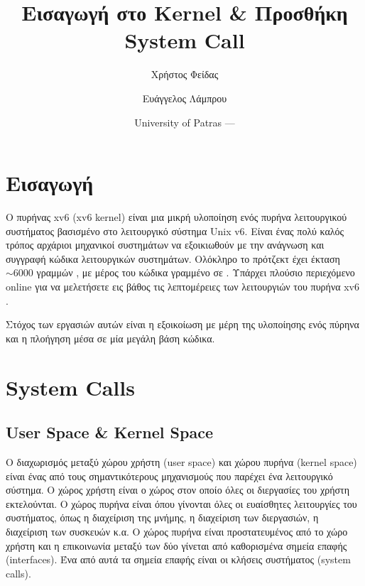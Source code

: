 \documentclass[18pt]{extarticle}
\title{Εισαγωγή στο \src{xv6} Kernel \& Προσθήκη System Call} %
\author{\footnotesize Χρήστος Φείδας\\ \footnotesize \src{fidas@upatras.gr} \and \footnotesize Ευάγγελος Λάμπρου\\ \footnotesize \src{e.lamprou@upnet.gr}} %
\date{University of Patras --- \the\year{}} %
\begin{document}
\pagestyle{fancy}
\fancyhf{} %
\renewcommand{\headrulewidth}{0pt}
\fancyhead{} %
\fancyfoot{} %
\fancyfoot[L]{}
\fancyfoot[R]{\thepage}

\maketitle



\section{Εισαγωγή}

Ο πυρήνας xv6 (xv6 kernel) \cite{xv6Kernel} είναι μια μικρή υλοποίηση ενός πυρήνα λειτουργικού 
συστήματος βασισμένο στο λειτουργικό σύστημα Unix v6.
Είναι ένας πολύ καλός τρόπος αρχάριοι μηχανικοί συστημάτων να εξοικιωθούν με την ανάγνωση και συγγραφή 
κώδικα λειτουργικών συστημάτων. Ολόκληρο το πρότζεκτ έχει έκταση $\sim 6000$ γραμμών 
, με μέρος του κώδικα γραμμένο σε .
Υπάρχει πλούσιο περιεχόμενο online για να μελετήσετε εις βάθος τις λεπτομέρειες
των λειτουργιών του πυρήνα xv6 \cite{xv6VideoSeries, xv6Book}.

Στόχος των εργασιών αυτών είναι η εξοικοίωση με μέρη της υλοποίησης ενός πύρηνα και
η πλοήγηση μέσα σε μία μεγάλη βάση κώδικα.

\section{System Calls}

\subsection{User Space \& Kernel Space}

Ο διαχωρισμός μεταξύ χώρου χρήστη (user space) και χώρου πυρήνα (kernel space) είναι ένας από τους
σημαντικότερους μηχανισμούς που παρέχει ένα λειτουργικό σύστημα. Ο χώρος χρήστη είναι ο χώρος
στον οποίο όλες οι διεργασίες του χρήστη εκτελούνται. Ο χώρος πυρήνα είναι όπου γίνονται 
όλες οι ευαίσθητες λειτουργίες του συστήματος, όπως η διαχείριση της μνήμης, η διαχείριση των
διεργασιών, η διαχείριση των συσκευών κ.α. Ο χώρος πυρήνα είναι προστατευμένος από το χώρο χρήστη
και η επικοινωνία μεταξύ των δύο γίνεται από καθορισμένα σημεία επαφής (interfaces).
Ένα από αυτά τα σημεία επαφής είναι οι κλήσεις συστήματος (system calls).
\end{document}
